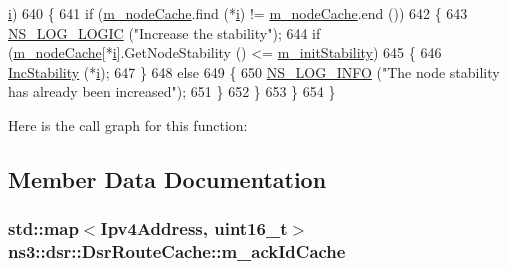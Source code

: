 \begin{DoxyCode}
      \hyperlink{bernuolliDistribution_8m_a6f6ccfcf58b31cb6412107d9d5281426}{i})
640     \{
641       \textcolor{keywordflow}{if} (\hyperlink{classns3_1_1dsr_1_1DsrRouteCache_a2ad918da9614405b305be6c18ed04502}{m\_nodeCache}.find (*\hyperlink{bernuolliDistribution_8m_a6f6ccfcf58b31cb6412107d9d5281426}{i}) != \hyperlink{classns3_1_1dsr_1_1DsrRouteCache_a2ad918da9614405b305be6c18ed04502}{m\_nodeCache}.end ())
642         \{
643           \hyperlink{group__logging_ga88acd260151caf2db9c0fc84997f45ce}{NS\_LOG\_LOGIC} (\textcolor{stringliteral}{"Increase the stability"});
644           \textcolor{keywordflow}{if} (\hyperlink{classns3_1_1dsr_1_1DsrRouteCache_a2ad918da9614405b305be6c18ed04502}{m\_nodeCache}[*\hyperlink{bernuolliDistribution_8m_a6f6ccfcf58b31cb6412107d9d5281426}{i}].GetNodeStability () <= \hyperlink{classns3_1_1dsr_1_1DsrRouteCache_a33fe450058c846a3ebdd386ad5a11208}{m\_initStability})
645             \{
646               \hyperlink{classns3_1_1dsr_1_1DsrRouteCache_aa638a140150404cc82a5937bcc622395}{IncStability} (*\hyperlink{bernuolliDistribution_8m_a6f6ccfcf58b31cb6412107d9d5281426}{i});
647             \}
648           \textcolor{keywordflow}{else}
649             \{
650               \hyperlink{group__logging_gafbd73ee2cf9f26b319f49086d8e860fb}{NS\_LOG\_INFO} (\textcolor{stringliteral}{"The node stability has already been increased"});
651             \}
652         \}
653     \}
654 \}
\end{DoxyCode}


Here is the call graph for this function\+:




\subsection{Member Data Documentation}
\subsubsection[{\texorpdfstring{m\+\_\+ack\+Id\+Cache}{m_ackIdCache}}]{\setlength{\rightskip}{0pt plus 5cm}std\+::map$<${\bf Ipv4\+Address}, uint16\+\_\+t$>$ ns3\+::dsr\+::\+Dsr\+Route\+Cache\+::m\+\_\+ack\+Id\+Cache\hspace{0.3cm}{\ttfamily [private]}}\hypertarget{classns3_1_1dsr_1_1DsrRouteCache_a5f4c097ed11c2c1447699214bc4be0e0}{}\label{classns3_1_1dsr_1_1DsrRouteCache_a5f4c097ed11c2c1447699214bc4be0e0}


